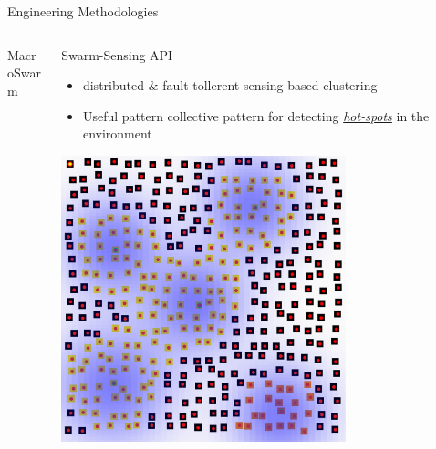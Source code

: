\documentclass[presentation, 9pt, aspectratio=169]{beamer}\mode<presentation>{\usetheme{AMSBolognaFC}}
\begin{document}
\begin{frame}{Engineering Methodologies}
\begin{columns}[t]
\begin{column}{0.31\textwidth}
\begin{exampleblock}{MacroSwarm~\cite{macroswarm}}
\end{exampleblock}
\end{column}
\begin{column}{0.31\textwidth}
\footnotesize{
\begin{exampleblock}{Swarm-Sensing API~\cite{swarm-clustering}}
  \begin{itemize}
    \item distributed \& fault-tollerent sensing based clustering
    \item Useful pattern collective pattern for detecting \emph{\underline{hot-spots}} in the environment
  \end{itemize}
  \centering
  \includegraphics[width=0.7\textwidth]{img/after-merge.png}
\end{exampleblock}
}  
\end{column}
\end{columns}
\end{frame}
\end{document}
